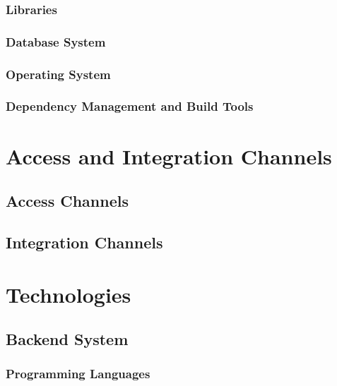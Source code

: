 \documentclass[11pt,fleqn]{book} %
\begin{document}
		\subsection{Libraries}
		\subsection{Database System}
		\subsection{Operating System}
		\subsection{Dependency Management and Build Tools}	
	
	


\chapter{Access and Integration Channels}

	\section{Access Channels}
	\section{Integration Channels}
	


\chapter{Technologies}

	\section{Backend System}
		\subsection{Programming Languages}
\end{document}
